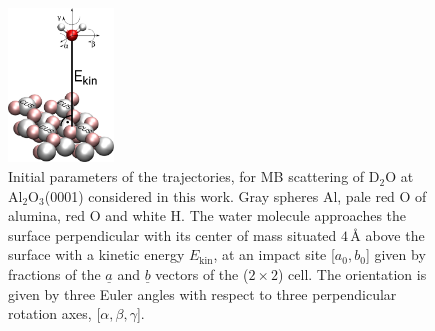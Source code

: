 \documentclass[11pt,DIV=13,BCOR=5mm,a4paper,headinclude]{scrbook}
\renewcommand{\vec}[1]{\underline{#1}}
\begin{document}
\begin{figure}[!h]
 \centering
\includegraphics[width=0.25\textwidth]{figures/0001/perspective+h2o_new.png}
 \caption{Initial parameters of the trajectories, for MB scattering of D$_2$O at Al$_2$O$_3$(0001) considered in this work. Gray spheres Al, pale red O of alumina, red O and white H.
The water molecule approaches the surface perpendicular with its center of mass situated $4\,$\AA{} above the surface with a kinetic energy $E_\textrm{kin}$, at an impact site [$a_0,b_0$] given by fractions of the $\vec{a}$ and $\vec{b}$ vectors of the ($2\times 2$) cell.
The orientation is given by three Euler angles with respect to three perpendicular rotation axes, [$\alpha,\beta,\gamma$].}
        \label{abb:initial_parameters}
 \end{figure}
 
\end{document}
